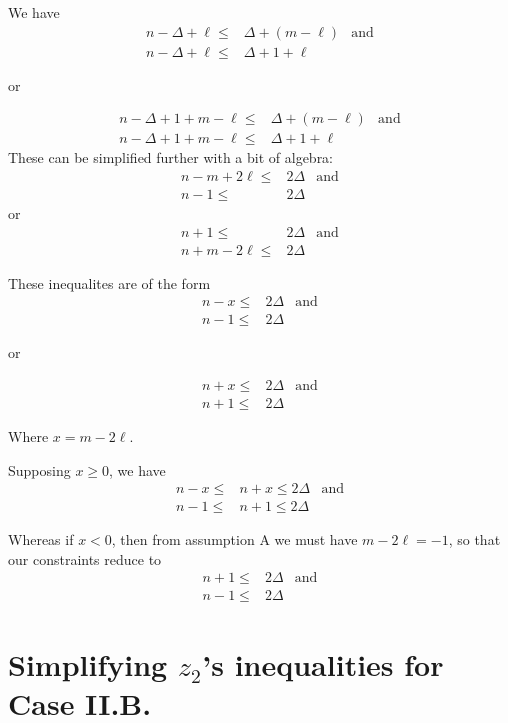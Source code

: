 We have
\begin{align*}
 n - \Delta + \ell \leq & \Delta + (m - \ell) & \text{and} \\
 n - \Delta + \ell \leq & \Delta + 1 + \ell
\end{align*}
\begin{center}or\end{center}
\begin{align*}
 n - \Delta + 1 + m - \ell \leq & \Delta + (m - \ell) & \text{and} \\
 n - \Delta + 1 + m - \ell \leq & \Delta + 1 + \ell
\end{align*}
These can be simplified further with a bit of algebra:
\begin{align*}
 n-m +2\ell \leq & 2 \Delta & \text{and} \\
 n-1 \leq        & 2\Delta
\end{align*}
or
\begin{align*}
 n + 1 \leq         & 2 \Delta & \text{and} \\
 n + m - 2\ell \leq & 2 \Delta
\end{align*}

These inequalites are of the form
\begin{align*}
 n-x \leq & 2 \Delta & \text{and} \\
 n-1 \leq & 2\Delta
\end{align*}
\begin{center}or\end{center}
\begin{align*}
 n + x \leq & 2 \Delta & \text{and} \\
 n + 1 \leq & 2 \Delta
\end{align*}

Where $x = m -2\ell$.

Supposing $x\geq 0$, we have
\begin{align*}
 n-x \leq & n+x \leq 2 \Delta & \text{and} \\
 n-1 \leq & n+1 \leq 2\Delta
\end{align*}

Whereas if $x <0$, then from assumption A we must have $m-2\ell = -1$, so that
our constraints reduce to
\begin{align*}
 n+1 \leq & 2 \Delta & \text{and} \\
 n-1 \leq & 2 \Delta
\end{align*}

\newpage
\section{Simplifying $z_2$'s inequalities for Case II.B.}

